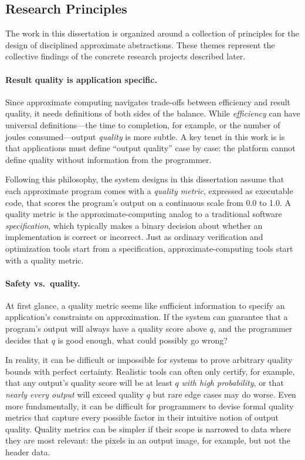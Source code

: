 \subsection{Research Principles}

The work in this dissertation is organized around a collection of principles
for the design of disciplined approximate abstractions.
These themes represent the collective findings of the concrete research
projects described later.

\paragraph{Result quality is application specific.}

Since approximate computing navigates trade-offs between efficiency and result
quality, it needs definitions of both sides of the balance.
While \emph{efficiency} can have universal definitions---the time to
completion, for example, or the number of joules consumed---output
\emph{quality} is more subtle.
A key tenet in this work is is that applications must define ``output
quality'' case by case:
the platform cannot define quality without information from the programmer.

Following this philosophy, the system designs in this dissertation assume that
each approximate program comes with a \emph{quality metric}, expressed as
executable code, that scores the program's output on a continuous scale from
0.0 to 1.0.
A quality metric is the approximate-computing analog to a traditional software
\emph{specification}, which typically makes a binary decision about whether an
implementation is correct or incorrect.
Just as ordinary verification and optimization tools start from a
specification, approximate-computing tools start with a quality metric.

\paragraph{Safety vs.~quality.}

At first glance, a quality metric seems like sufficient information to specify
an application's constraints on approximation.
If the system can guarantee that a program's output will always have a quality
score above $q$, and the programmer decides that $q$ is good enough, what
could possibly go wrong?

In reality, it can be difficult or impossible for systems to prove arbitrary
quality bounds with perfect certainty.
Realistic tools can often only certify, for example, that any output's quality
score will be at least $q$ \emph{with high probability},
or that \emph{nearly every output} will exceed quality $q$ but rare edge cases
may do worse.
Even more fundamentally, it can be difficult for programmers to devise formal
quality metrics that capture every possible factor in their intuitive notion
of output quality.
Quality metrics can be simpler if their scope is narrowed to data where they
are most relevant: the pixels in an output image, for example, but not the
header data.

